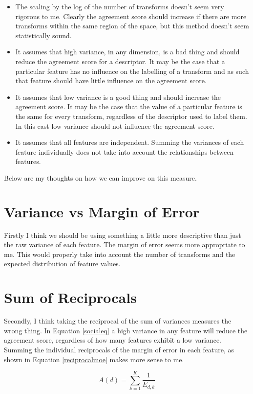 \documentclass[a4paper]{article}
\begin{document}
	\begin{itemize}
		\item The scaling by the log of the number of transforms doesn't seem very rigorous to me. Clearly the
			agreement score should increase if there are more transforms within the same region of the space,
			but this method doesn't seem statistically sound.
		\item It assumes that high variance, in any dimension, is a bad thing and should reduce the agreement
			score for a descriptor. It may be the case that a particular feature has no influence on the
			labelling of a transform and as such that feature should have little influence on the agreement
			score.
		\item It assumes that low variance is a good thing and should increase the agreement score. It may be the
			case that the value of a particular feature is the same for every transform, regardless of the
			descriptor used to label them. In this cast low variance should not influence the agreement score.
		\item It assumes that all features are independent. Summing the variances of each feature individually does
			not take into account the relationships between features. 
	\end{itemize}

Below are my thoughts on how we can improve on this measure.

\section*{Variance vs Margin of Error}
Firstly I think we should be using something a little more descriptive than just the raw variance of each feature. The
margin of error seems more appropriate to me. This would properly take into account the number of transforms and the
expected distribution of feature values.

\section*{Sum of Reciprocals}
Secondly, I think taking the reciprocal of the sum of variances measures the wrong thing. In Equation \ref{socialeq} a high
variance in any feature will reduce the agreement score, regardless of how many features exhibit a low variance. Summing the
individual reciprocals of the margin of error in each feature, as shown in Equation \ref{reciprocalmoe} makes more sense to
me.

	\begin{equation}
		A(d) = \sum_{k=1}^{K} \frac{1}{E_{d,k}}
		\label{reciprocalmoe}
	\end{equation}
\end{document}
